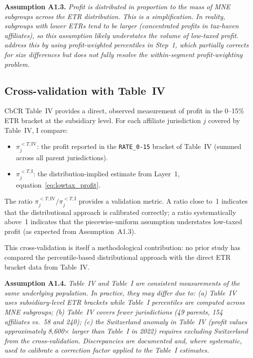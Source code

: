 \documentclass[11pt,a4paper]{article}
\newcommand{\code}[1]{\texttt{#1}}
\newcommand{\assumption}[2]{\noindent\textbf{Assumption #1.} \textit{#2}\medskip}
\begin{document}
\assumption{A1.3}{Profit is distributed in proportion to the mass of MNE subgroups across the ETR distribution. This is a simplification. In reality, subgroups with lower ETRs tend to be larger (concentrated profits in tax-haven affiliates), so this assumption likely \emph{understates} the volume of low-taxed profit. \citet{hugger2025} address this by using profit-weighted percentiles in Step~1, which partially corrects for size differences but does not fully resolve the within-segment profit-weighting problem.}

\subsection{Cross-validation with Table~IV}\label{sec:crossval}

CbCR Table~IV provides a direct, observed measurement of profit in the 0--15\% ETR bracket at the subsidiary level. For each affiliate jurisdiction $j$ covered by Table~IV, I compare:

\begin{itemize}
\item $\pi_j^{<T,\text{IV}}$: the profit reported in the \code{RATE\_0-15} bracket of Table~IV (summed across all parent jurisdictions).
\item $\pi_j^{<T,\text{I}}$: the distribution-implied estimate from Layer~1, equation~\eqref{eq:lowtax_profit}.
\end{itemize}

The ratio $\pi_j^{<T,\text{IV}} / \pi_j^{<T,\text{I}}$ provides a validation metric. A ratio close to~1 indicates that the distributional approach is calibrated correctly; a ratio systematically above~1 indicates that the piecewise-uniform assumption understates low-taxed profit (as expected from Assumption~A1.3).

This cross-validation is itself a methodological contribution: no prior study has compared the percentile-based distributional approach with the direct ETR bracket data from Table~IV.

\assumption{A1.4}{Table~IV and Table~I are consistent measurements of the same underlying population. In practice, they may differ due to: (a) Table~IV uses subsidiary-level ETR brackets while Table~I percentiles are computed across MNE subgroups; (b) Table~IV covers fewer jurisdictions (49 parents, 154 affiliates vs.\ 58 and 240); (c) the Switzerland anomaly in Table~IV (profit values approximately 8,600$\times$ larger than Table~I in 2022) requires excluding Switzerland from the cross-validation. Discrepancies are documented and, where systematic, used to calibrate a correction factor applied to the Table~I estimates.}
\end{document}
